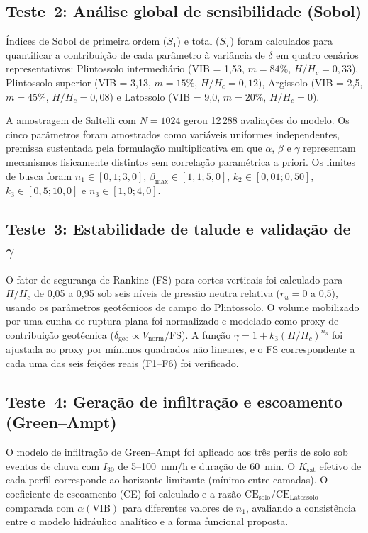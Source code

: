 \documentclass[preprint,review,12pt,authoryear]{elsarticle}
\begin{document}
\subsection{Teste~2: Análise global de sensibilidade (Sobol)}

Índices de Sobol de primeira ordem ($S_1$) e total ($S_T$) \citep{sobol_2001} foram calculados para quantificar a contribuição de cada parâmetro à variância de $\delta$ em quatro cenários representativos: Plintossolo intermediário (VIB = 1,53, $m = 84\%$, $H/H_c = 0{,}33$), Plintossolo superior (VIB = 3,13, $m = 15\%$, $H/H_c = 0{,}12$), Argissolo (VIB = 2,5, $m = 45\%$, $H/H_c = 0{,}08$) e Latossolo (VIB = 9,0, $m = 20\%$, $H/H_c = 0$). 

A amostragem de Saltelli \citep{saltelli_et_al_2004} com $N = 1024$ gerou 12\,288 avaliações do modelo. Os cinco parâmetros foram amostrados como variáveis uniformes independentes, premissa sustentada pela formulação multiplicativa em que $\alpha$, $\beta$ e $\gamma$ representam mecanismos fisicamente distintos sem correlação paramétrica a priori. Os limites de busca foram $n_1 \in [0{,}1; 3{,}0]$, $\beta_{\max} \in [1{,}1; 5{,}0]$, $k_2 \in [0{,}01; 0{,}50]$, $k_3 \in [0{,}5; 10{,}0]$ e $n_3 \in [1{,}0; 4{,}0]$.

\subsection{Teste~3: Estabilidade de talude e validação de $\gamma$}
\label{sec:test3}

O fator de segurança de Rankine (FS) \citep{rankine_1857} para cortes verticais foi calculado para $H/H_c$ de 0,05 a 0,95 sob seis níveis de pressão neutra relativa ($r_u = 0$ a 0,5), usando os parâmetros geotécnicos de campo do Plintossolo. O volume mobilizado por uma cunha de ruptura plana foi normalizado e modelado como proxy de contribuição geotécnica ($\delta_{\mathrm{geo}} \propto V_{\mathrm{norm}}/\mathrm{FS}$). A função $\gamma = 1 + k_3(H/H_c)^{n_3}$ foi ajustada ao proxy por mínimos quadrados não lineares, e o FS correspondente a cada uma das seis feições reais (F1--F6) foi verificado.

\subsection{Teste~4: Geração de infiltração e escoamento (Green--Ampt)}

O modelo de infiltração de Green--Ampt \citep{green_ampt_1911} foi aplicado aos três perfis de solo sob eventos de chuva com $I_{30}$ de 5--100~mm/h e duração de 60~min. O $K_{\mathrm{sat}}$ efetivo de cada perfil corresponde ao horizonte limitante (mínimo entre camadas). O coeficiente de escoamento (CE) foi calculado e a razão $\mathrm{CE}_{\mathrm{solo}}/\mathrm{CE}_{\mathrm{Latossolo}}$ comparada com $\alpha(\mathrm{VIB})$ para diferentes valores de $n_1$, avaliando a consistência entre o modelo hidráulico analítico e a forma funcional proposta.
\end{document}

